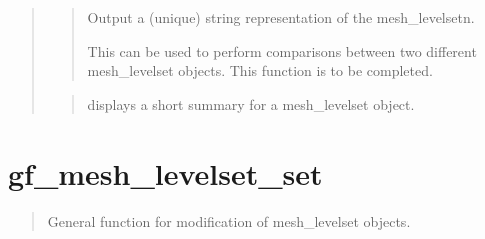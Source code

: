 \documentclass[a4paper,11pt,english]{sphinxmanual}
\begin{document}
\begin{quote}
\begin{quote}
\sphinxAtStartPar
Output a (unique) string representation of the mesh\_levelsetn.

\sphinxAtStartPar
This can be used to perform comparisons between two
different mesh\_levelset objects.
This function is to be completed.
\end{quote}

\sphinxAtStartPar
{}
\begin{quote}

\sphinxAtStartPar
displays a short summary for a mesh\_levelset object.
\end{quote}
\end{quote}


\section{gf\_mesh\_levelset\_set}
\label{\detokenize{matlab_octave/cmdref_gf_mesh_levelset_set:gf-mesh-levelset-set}}\label{\detokenize{matlab_octave/cmdref_gf_mesh_levelset_set::doc}}
\sphinxAtStartPar
{}

\begin{sphinxVerbatim}[commandchars=\\\{\}]
    
    
  
\end{sphinxVerbatim}

\sphinxAtStartPar
{}
\begin{quote}

\sphinxAtStartPar
General function for modification of mesh\_levelset objects.
\end{quote}
\end{document}
